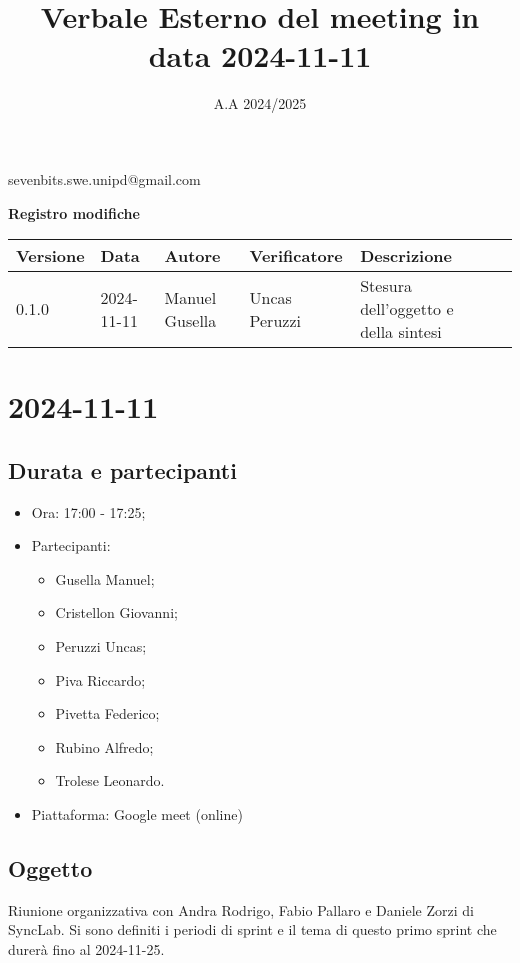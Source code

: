\documentclass[12pt]{article}
\title{Verbale Esterno del meeting in data 2024-11-11}
\date{A.A 2024/2025}
\begin{document}
\maketitle
\center 
sevenbits.swe.unipd@gmail.com\\
\vspace{2mm}

\textbf{Registro modifiche}\\
\vspace{2mm}
\begin{tabular}{|l|l|l|l|l|l|}
\hline
\textbf{Versione} & \textbf{Data} & \textbf{Autore} & \textbf{Verificatore} & \textbf{Descrizione} \\
\hline
0.1.0 & 2024-11-11 & Manuel Gusella & Uncas Peruzzi & Stesura dell'oggetto e della sintesi\\
\hline
\end{tabular}

\raggedright
\tableofcontents
\newpage
\section{2024-11-11}
\subsection{Durata e partecipanti}
\begin{itemize}
\item Ora: 17:00 - 17:25;
\item Partecipanti: 	
	\begin{itemize}
	\item Gusella Manuel;
	\item Cristellon Giovanni;
	\item Peruzzi Uncas;
	\item Piva Riccardo;
	\item Pivetta Federico;
	\item Rubino Alfredo;
	\item Trolese Leonardo.
	\end{itemize}
\item Piattaforma: Google meet (online)
\end{itemize}
\subsection{Oggetto}
Riunione organizzativa con Andra Rodrigo, Fabio Pallaro e Daniele Zorzi di SyncLab.
Si sono definiti i periodi di sprint e il tema di questo primo sprint che durerà fino al 2024-11-25.
\end{document}
